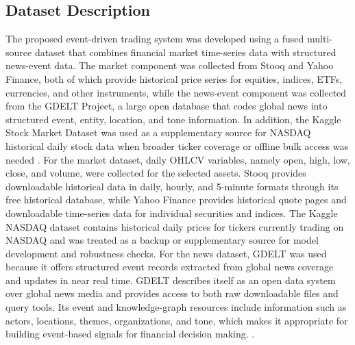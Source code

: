 \documentclass[a4paper,fleqn]{cas-sc}
\begin{document}
\subsection{Dataset Description}\label{sec:Dataset}
The proposed event-driven trading system was developed using a fused multi-source dataset that combines financial market time-series data with structured news-event data. The market component was collected from Stooq and Yahoo Finance, both of which provide historical price series for equities, indices, ETFs, currencies, and other instruments, while the news-event component was collected from the GDELT Project, a large open database that codes global news into structured event, entity, location, and tone information. In addition, the Kaggle Stock Market Dataset was used as a supplementary source for NASDAQ historical daily stock data when broader ticker coverage or offline bulk access was needed \cite{stooq_historical_data}. 
For the market dataset, daily OHLCV variables, namely open, high, low, close, and volume, were collected for the selected assets. Stooq provides downloadable historical data in daily, hourly, and 5-minute formats through its free historical database, while Yahoo Finance provides historical quote pages and downloadable time-series data for individual securities and indices. The Kaggle NASDAQ dataset contains historical daily prices for tickers currently trading on NASDAQ and was treated as a backup or supplementary source for model development and robustness checks. 
For the news dataset, GDELT was used because it offers structured event records extracted from global news coverage and updates in near real time. GDELT describes itself as an open data system over global news media and provides access to both raw downloadable files and query tools. Its event and knowledge-graph resources include information such as actors, locations, themes, organizations, and tone, which makes it appropriate for building event-based signals for financial decision making. \cite{gdelt_project}. 
\end{document}
